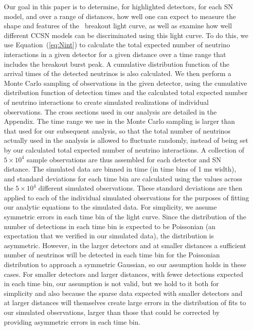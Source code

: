 Our goal in this paper is to determine, for highlighted detectors, 
for each SN
model, and over a range of distances, how well one can expect to measure 
the shape and features of the \nue\ breakout light curve, as well as
examine how well different CCSN models can be discriminated using this
light curve. To do this, we use
Equation~(\ref{eq:Nint}) to calculate the total expected number of
neutrino interactions in a given detector for a given distance over a
time range that includes 
the breakout burst peak.  A cumulative distribution function of
the arrival times of the detected neutrinos is also calculated.  We
then perform a Monte Carlo sampling of observations in the given
detector, using the cumulative distribution function of detection
times and the calculated total expected number of neutrino
interactions to create simulated realizations of individual
observations.  
The cross sections used in our analysis are detailed in
the Appendix.
The time range we use in the Monte Carlo sampling is
larger than that used for our subsequent analysis, so that the total
number of neutrinos actually used in the analysis is allowed to
fluctuate randomly, instead of being set by our calculated total expected
number of neutrino interactions.   A collection of $5\times10^4$ 
sample observations are thus assembled for each detector and SN
distance.  The simulated data
are binned in time (in time bins of 1 ms width), 
and standard deviations for each time bin are
calculated using the values across the $5\times10^4$ different
simulated observations.
These standard deviations are then applied to each of the individual simulated
observations for the purposes of fitting our analytic equations to the
simulated data.  For simplicity, we assume symmetric errors in each
time bin of the light curve.  Since the distribution of the number 
of detections in
each time bin is expected to be Poissonian (an expectation that we
verified in our simulated data), the distribution is asymmetric.  
However, in the larger detectors
and at smaller distances a sufficient number of neutrinos will be
detected in each time bin for the Poissonian distribution to approach a
symmetric Gaussian, so our assumption holds in these cases.  For
smaller detectors and larger distances, with fewer detections expected
in each time bin, our assumption is not valid, but we hold to it both
for simplicity and also because the sparse data expected with smaller
detectors and at larger distances will themselves create large errors in the
distribution of fits to our simulated observations, larger than those
that could be corrected by providing asymmetric errors in each time bin.

